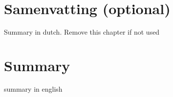 \chapter*{Samenvatting (optional)}
Summary in dutch. Remove this chapter if not used

\cleardoublepage
{}
\chapter*{Summary}
summary in english